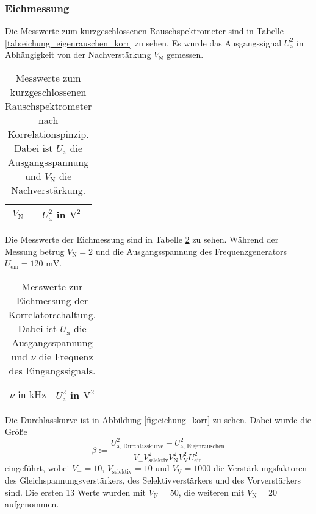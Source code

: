 		\subsubsection{Eichmessung}
	
		Die Messwerte zum kurzgeschlossenen Rauschspektrometer sind 
		in Tabelle \ref{tab:eichung_eigenrauschen_korr} zu sehen. 
		Es wurde das Ausgangssignal $U^2_\text{a}$ in Abhängigkeit von 
		der Nachverstärkung $V_\text{N}$ gemessen.
		
		\begin{table}[h]
		\centering
			\begin{tabular}{cc}
				\toprule \midrule
				$V_\text{N}$ & $U^2_\text{a}$ in $\text{V}^2$
				\\
				\midrule
				
				\midrule \bottomrule
			\end{tabular}
			\caption{Messwerte zum kurzgeschlossenen  
			Rauschspektrometer nach Korrelationspinzip. Dabei ist $U_\text{a}$ die 
			Ausgangsspannung und $V_\text{N}$ die Nachverstärkung.}
			\label{tab:eichung_eigenrauschen_einfach}
		\end{table}
		
		Die Messwerte der Eichmessung sind in Tabelle 
		\ref{tab:eichung_korr} zu sehen. Während der Messung 
		betrug $V_\text{N}=2$ und die Ausgangsspannung des 
		Frequenzgenerators $U_\text{ein} = 120 \text{ mV}$.
		
		\begin{table}[h]
		\centering
			\begin{tabular}{cc}
				\toprule \midrule
				$\nu \text{ in} \text{ kHz}$ & $U^2_\text{a}$ in $\text{V}^2$ 
				\\
				\midrule
				
				\midrule \bottomrule
			\end{tabular}
			\caption{Messwerte zur Eichmessung der Korrelatorschaltung. Dabei ist $U_\text{a}$ 
			die 
			Ausgangsspannung und $\nu$ die Frequenz des 
			Eingangssignals. }
			\label{tab:eichung_korr}
		\end{table}
		
		Die Durchlasskurve ist in Abbildung \ref{fig:eichung_korr} zu sehen. Dabei wurde die Größe  
		\begin{equation}
		\beta := \frac{U^2_\text{a, Durchlasskurve}-U_\text{a, Eigenrauschen}^2}
		{V_= V_\text{selektiv}^2 V_\text{N}^2 V_\text{V}^2  U^2_\text{ein}}
		\end{equation}
		eingeführt, wobei $V_= =10$, $V_\text{selektiv}=10$ und $V_\text{V}=1000$
		die Verstärkungsfaktoren des Gleichspannungsverstärkers, des Selektivverstärkers und des 
		Vorverstärkers sind. Die ersten 13 Werte wurden mit $V_\text{N}=50$, die weiteren 
		mit $V_\text{N}=20$ aufgenommen.
				

